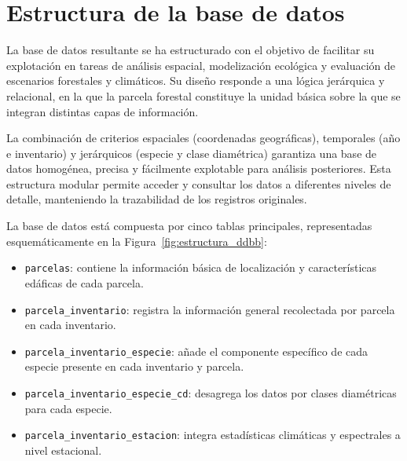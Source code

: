 \section{Estructura de la base de datos}


La base de datos resultante se ha estructurado con el objetivo de facilitar su explotación en tareas de análisis espacial, modelización ecológica y evaluación de escenarios forestales y climáticos. Su diseño responde a una lógica jerárquica y relacional, en la que la parcela forestal constituye la unidad básica sobre la que se integran distintas capas de información.

\medskip

La combinación de criterios espaciales (coordenadas geográficas), temporales (año e inventario) y jerárquicos (especie y clase diamétrica) garantiza una base de datos homogénea, precisa y fácilmente explotable para análisis posteriores. Esta estructura modular permite acceder y consultar los datos a diferentes niveles de detalle, manteniendo la trazabilidad de los registros originales.

\medskip

La base de datos está compuesta por cinco tablas principales, representadas esquemáticamente en la Figura~\ref{fig:estructura_ddbb}:
\begin{itemize}
    \item \texttt{parcelas}: contiene la información básica de localización y características edáficas de cada parcela.
    \item \texttt{parcela\_inventario}: registra la información general recolectada por parcela en cada inventario.
    \item \texttt{parcela\_inventario\_especie}: añade el componente específico de cada especie presente en cada inventario y parcela.
    \item \texttt{parcela\_inventario\_especie\_cd}: desagrega los datos por clases diamétricas para cada especie.
    \item \texttt{parcela\_inventario\_estacion}: integra estadísticas climáticas y espectrales a nivel estacional.
\end{itemize}

